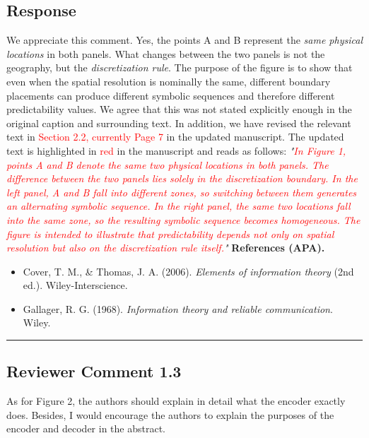 \documentclass{NSF}
\begin{document}
\subsection{Response}
We appreciate this comment. Yes, the points A and B represent the \emph{same physical locations} in both panels. What changes between the two panels is not the geography, but the \emph{discretization rule}. The purpose of the figure is to show that even when the spatial resolution is nominally the same, different boundary placements can produce different symbolic sequences and therefore different predictability values. We agree that this was not stated explicitly enough in the original caption and surrounding text.
\noindent In addition, we have revised the relevant text in \textcolor{red}{Section 2.2, currently Page 7} in the updated manuscript. The updated text is highlighted in \textcolor{red}{red} in the manuscript and reads as follows:
\vskip 0.1cm
\noindent \textit{"\textcolor{red}{In Figure 1, points A and B denote the same two physical locations in both panels. The difference between the two panels lies solely in the discretization boundary. In the left panel, A and B fall into different zones, so switching between them generates an alternating symbolic sequence. In the right panel, the same two locations fall into the same zone, so the resulting symbolic sequence becomes homogeneous. The figure is intended to illustrate that predictability depends not only on spatial resolution but also on the discretization rule itself.}"}
\vskip 0.05in
\noindent\textbf{References (APA).}
\begin{itemize}
    \item Cover, T. M., \& Thomas, J. A. (2006). \textit{Elements of information theory} (2nd ed.). Wiley-Interscience.
    \item Gallager, R. G. (1968). \textit{Information theory and reliable communication}. Wiley.
\end{itemize}

\noindent\rule{16.5cm}{1.0pt}

\subsection{Reviewer Comment 1.3}
\begin{mdframed}
As for Figure 2, the authors should explain in detail what the encoder exactly does. Besides, I would encourage the authors to explain the purposes of the encoder and decoder in the abstract.
\end{mdframed}
\end{document}
